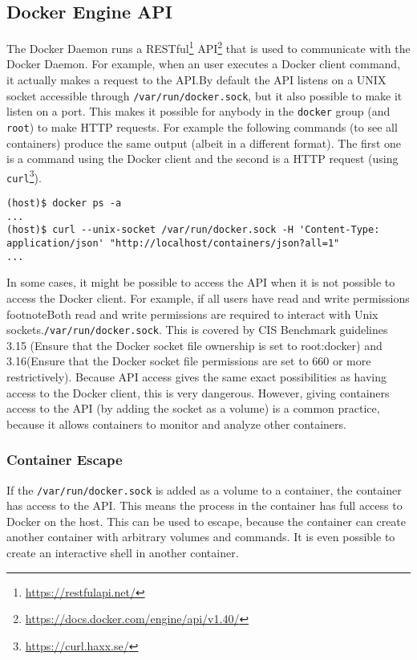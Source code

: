 \subsection{Docker Engine API}\label{subsection:api}

The Docker Daemon runs a RESTful\footnote{\url{https://restfulapi.net/}} API\footnote{\url{https://docs.docker.com/engine/api/v1.40/}} that is used to communicate with the Docker Daemon. For example, when an user executes a Docker client command, it actually makes a request to the API.\@ By default the API listens on a UNIX socket accessible through \lstinline{/var/run/docker.sock}, but it also possible to make it listen on a port. This makes it possible for anybody in the \lstinline{docker} group (and \lstinline{root}) to make HTTP requests. For example the following commands (to see all containers) produce the same output (albeit in a different format). The first one is a command using the Docker client and the second is a HTTP request (using \lstinline{curl}\footnote{\url{https://curl.haxx.se/}}).
\begin{lstlisting}[caption={Docker client and Socket},captionpos=b]
(host)$ docker ps -a
...
(host)$ curl --unix-socket /var/run/docker.sock -H 'Content-Type: application/json' "http://localhost/containers/json?all=1"
...
\end{lstlisting}

\hfill

In some cases, it might be possible to access the API when it is not possible to access the Docker client. For example, if all users have read and write permissions footnote{Both read and write permissions  are required to interact with Unix sockets.}\lstinline{/var/run/docker.sock}. This is covered by CIS Benchmark guidelines 3.15 (Ensure that the Docker socket file ownership is set to root:docker) and 3.16(Ensure that the Docker socket file permissions are set to 660 or more restrictively).
Because API access gives the same exact possibilities as having access to the Docker client, this is very dangerous\cite{The-Dangers-Of-Docker-Sock}.
However, giving containers access to the API (by adding the socket as a volume) is a common practice, because it allows containers to monitor and analyze other containers.

\subsubsection{Container Escape}
If the \lstinline{/var/run/docker.sock} is added as a volume to a container, the container has access to the API\@. This means the process in the container has full access to Docker on the host. This can be used to escape, because the container can create another container with arbitrary volumes and commands. It is even possible to create an interactive shell in another container\cite{Escape-Socket-Shell}.

